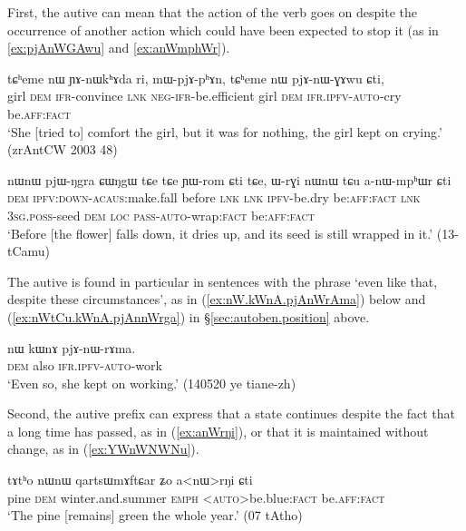 First, the autive can mean that the action of the verb goes on despite the occurrence of another action which could have been expected to stop it (as in \ref{ex:pjAnWGAwu} and \ref{ex:anWmphWr}).  

\begin{exe}
\ex \label{ex:pjAnWGAwu}
\gll tɕʰeme nɯ ɲɤ-nɯkʰɤda ri, mɯ-pjɤ-pʰɤn, tɕʰeme nɯ pjɤ-nɯ-ɣɤwu ɕti, \\
girl \textsc{dem} \textsc{ifr}-convince \textsc{lnk} \textsc{neg}-\textsc{ifr}-be.efficient girl \textsc{dem} \textsc{ifr}.\textsc{ipfv}-\textsc{auto}-cry  be.\textsc{aff}:\textsc{fact} \\
\glt `She [tried to] comfort the girl, but it was for nothing, the girl kept on crying.' (zrAntCW 2003 48)
\end{exe} 

\begin{exe}
\ex \label{ex:anWmphWr}
\gll nɯnɯ pjɯ-ŋgra ɕɯŋgɯ tɕe tɕe ɲɯ-rom ɕti tɕe, ɯ-rɣi nɯnɯ tɕu a-nɯ-mpʰɯr ɕti \\
\textsc{dem} \textsc{ipfv}:\textsc{down}-\textsc{acaus}:make.fall before \textsc{lnk}  \textsc{lnk} \textsc{ipfv}-be.dry be:\textsc{aff}:\textsc{fact} \textsc{lnk} \textsc{3sg}.\textsc{poss}-seed \textsc{dem} \textsc{loc} \textsc{pass}-\textsc{auto}-wrap:\textsc{fact} be:\textsc{aff}:\textsc{fact} \\
\glt `Before [the flower] falls down, it dries up, and its seed is still wrapped in it.' (13-tCamu)
\end{exe} 

The autive is found in particular in sentences with the phrase  `even like that, despite these circumstances', as in (\ref{ex:nW.kWnA.pjAnWrAma}) below and (\ref{ex:nWtCu.kWnA.pjAnnWrga}) in §\ref{sec:autoben.position} above.

\begin{exe}
\ex \label{ex:nW.kWnA.pjAnWrAma}
\gll  nɯ kɯnɤ pjɤ-nɯ-rɤma. \\
 \textsc{dem} also \textsc{ifr}.\textsc{ipfv}-\textsc{auto}-work \\ 
\glt `Even so, she kept on working.' (140520 ye tiane-zh) 
\end{exe} 
 
Second, the autive  prefix can express that a state continues despite the fact that a long time has passed, as in (\ref{ex:anWrŋi}), or that it is maintained without change, as in (\ref{ex:YWnWNWNu}).

\begin{exe}
\ex \label{ex:anWrŋi}
\gll tɤtʰo nɯnɯ qartsɯmɤftɕar ʑo a<nɯ>rŋi ɕti \\
pine \textsc{dem} winter.and.summer \textsc{emph} <\textsc{auto}>be.blue:\textsc{fact} be.\textsc{aff}:\textsc{fact} \\
\glt `The pine [remains] green the whole year.' (07 tAtho)
\end{exe}
 

